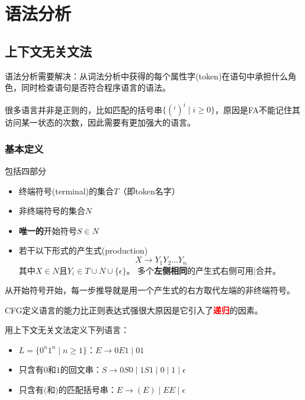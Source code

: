 
\section{语法分析}
\subsection{上下文无关文法}
语法分析需要解决：从词法分析中获得的每个属性字(token)在语句中承担什么角色，同时检查语句是否符合程序语言的语法。

很多语言并非是正则的，比如匹配的括号串$\{(^i)^i\mid i\geq 0\}$，原因是FA不能记住其访问某一状态的次数，因此需要有更加强大的语言。

\subsubsection{基本定义}
\begin{definition}
包括四部分
\begin{itemize}
	\item 终端符号(terminal)的集合$T$（即token名字）
	\item 非终端符号的集合$N$
	\item \textbf{唯一的}开始符号$S\in N$
	\item 若干以下形式的产生式(production)
	\[X\to Y_1Y_2\ldots Y_n\]
	其中$X\in N$且$Y_i\in T\cup N\cup\{\epsilon\}$。
	多个\textbf{左侧相同}的产生式右侧可用$\mid$合并。
\end{itemize}
\end{definition}
\begin{definition}[推导(derivation)]
从开始符号开始，每一步推导就是用一个产生式的右方取代左端的非终端符号。
\end{definition}

CFG定义语言的能力比正则表达式强很大原因是它引入了\textcolor{red}{\textbf{递归}}的因素。

\begin{example}
用上下文无关文法定义下列语言：
\begin{itemize}
	\item $L=\{0^n1^n\mid n\geq 1\}$：$E\to 0E1\mid 01$
	\item 只含有$0$和$1$的回文串：$S\to 0S0\mid 1S1\mid 0\mid 1\mid \epsilon$
	\item 只含有$($和$)$的匹配括号串：$E\to (E)\mid EE\mid \epsilon$
\end{itemize}
\end{example}

